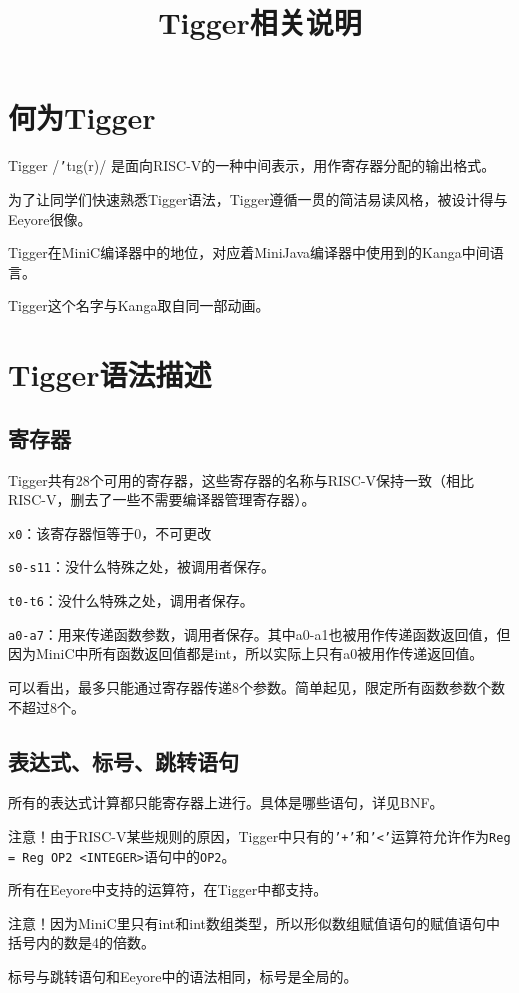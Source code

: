 \documentclass{ctexart}
\title{Tigger相关说明}
\date{}
\author{}
\begin{document}
\maketitle
\section{何为Tigger}
Tigger /\texttt{'}t\i g\textschwa (r)/ 是面向RISC-V的一种中间表示，用作寄存器分配的输出格式。

为了让同学们快速熟悉Tigger语法，Tigger遵循一贯的简洁易读风格，被设计得与Eeyore很像。

Tigger在MiniC编译器中的地位，对应着MiniJava编译器中使用到的Kanga中间语言。

Tigger这个名字与Kanga取自同一部动画。

\section{Tigger语法描述}
\subsection{寄存器}
Tigger共有28个可用的寄存器，这些寄存器的名称与RISC-V保持一致（相比RISC-V，删去了一些不需要编译器管理寄存器）。

\texttt{x0}：该寄存器恒等于0，不可更改

\texttt{s0-s11}：没什么特殊之处，被调用者保存。

\texttt{t0-t6}：没什么特殊之处，调用者保存。

\texttt{a0-a7}：用来传递函数参数，调用者保存。其中a0-a1也被用作传递函数返回值，但因为MiniC中所有函数返回值都是int，所以实际上只有a0被用作传递返回值。

可以看出，最多只能通过寄存器传递8个参数。简单起见，限定所有函数参数个数不超过8个。

\subsection{表达式、标号、跳转语句}
所有的表达式计算都只能寄存器上进行。具体是哪些语句，详见BNF。

注意！由于RISC-V某些规则的原因，Tigger中只有的\texttt{'+'}和\texttt{'<'}运算符允许作为\texttt{Reg = Reg OP2 <INTEGER>}语句中的\texttt{OP2}。

所有在Eeyore中支持的运算符，在Tigger中都支持。

注意！因为MiniC里只有int和int数组类型，所以形似数组赋值语句的赋值语句中括号内的数是4的倍数。

标号与跳转语句和Eeyore中的语法相同，标号是全局的。
\end{document}
